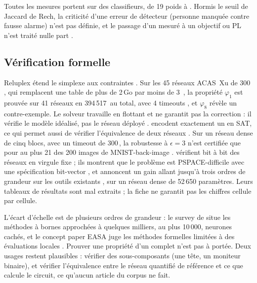 Toutes les mesures portent sur des classifieurs, de 19 poids à . Hormis le seuil de
Jaccard de Rech, la criticité d'une erreur de détecteur (personne manquée contre fausse
alarme) n'est pas définie, et le passage d'un  mesuré à un objectif  ou PL n'est
traité nulle part \deduit.

\subsection{Vérification formelle}

Reluplex \citep{arxiv-1702.01135-reluplex-efficient-smt-solver-verifying}\pp{} étend le
simplexe aux contraintes . Sur les 45 réseaux ACAS~Xu de 300 , qui remplacent une
table de plus de 2\,Go par moins de 3\, , la propriété $\varphi_1$ est prouvée sur
41 réseaux en 394\,517\, au total, avec 4 timeouts , et $\varphi_8$ révèle un
contre-exemple. Le solveur travaille en flottant et ne garantit pas la correction
 : il vérifie le modèle idéalisé, pas le réseau déployé \deduit.
\citet{arxiv-1709.06662-verifying-properties-binarized-deep-neural}\pp{} encodent
exactement un  en SAT, ce qui permet aussi de vérifier l'équivalence de deux réseaux
. Sur un réseau dense de cinq blocs, avec un timeout de 300\,, la robustesse à
$\epsilon = 3$ n'est certifiée que pour au plus 21 des 200 images de MNIST-back-image
. \citet{arxiv-2012.08185-scalable-verification-quantized-neural-networks}
vérifient bit à bit des réseaux en virgule fixe ; ils montrent que le problème est
PSPACE-difficile avec une spécification bit-vector , et annoncent un gain
allant jusqu'à trois ordres de grandeur sur les outils existants , sur un
réseau dense de 52\,650 paramètres. Leurs tableaux de résultats sont mal extraits ; la
fiche ne garantit pas les chiffres cellule par cellule.

L'écart d'échelle est de plusieurs ordres de grandeur : le survey de
\citet[§4.2, §4.3]{arxiv-1812.08342-survey-safety-trustworthiness-deep-neural}\pp{} situe
les méthodes à bornes approchées à quelques milliers, au plus 10\,000, neurones cachés, et
le concept paper EASA juge les méthodes formelles limitées à des évaluations locales
\citep[§C.3.1.6]{2024-easa-concept-paper-guidance-level-1}. Prouver une propriété d'un 
complet n'est pas à portée. Deux usages restent plausibles \deduit : vérifier des
sous-composants (une tête, un moniteur binaire), et vérifier l'équivalence entre le réseau
quantifié de référence et ce que calcule le circuit, ce qu'aucun article du corpus ne fait.


